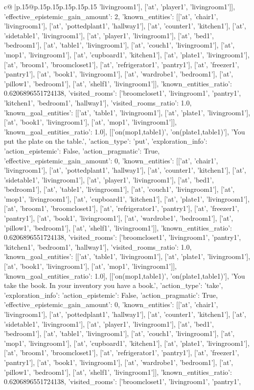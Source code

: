 \documentclass{article}
\begin{document}
{\begin{supertabular}{c@{$\;$}|p{.15\linewidth}@{}p{.15\linewidth}p{.15\linewidth}p{.15\linewidth}p{.15\linewidth}p{.15\linewidth}}
{{{'livingroom1'], ['at', 'player1', 'livingroom1']], 'effective_epistemic_gain_amount': 2, 'known_entities': [['at', 'chair1', 'livingroom1'], ['at', 'pottedplant1', 'hallway1'], ['at', 'counter1', 'kitchen1'], ['at', 'sidetable1', 'livingroom1'], ['at', 'player1', 'livingroom1'], ['at', 'bed1', 'bedroom1'], ['at', 'table1', 'livingroom1'], ['at', 'couch1', 'livingroom1'], ['at', 'mop1', 'livingroom1'], ['at', 'cupboard1', 'kitchen1'], ['at', 'plate1', 'livingroom1'], ['at', 'broom1', 'broomcloset1'], ['at', 'refrigerator1', 'pantry1'], ['at', 'freezer1', 'pantry1'], ['at', 'book1', 'livingroom1'], ['at', 'wardrobe1', 'bedroom1'], ['at', 'pillow1', 'bedroom1'], ['at', 'shelf1', 'livingroom1']], 'known_entities_ratio': 0.6206896551724138, 'visited_rooms': ['broomcloset1', 'livingroom1', 'pantry1', 'kitchen1', 'bedroom1', 'hallway1'], 'visited_rooms_ratio': 1.0, 'known_goal_entities': [['at', 'table1', 'livingroom1'], ['at', 'plate1', 'livingroom1'], ['at', 'book1', 'livingroom1'], ['at', 'mop1', 'livingroom1']], 'known_goal_entities_ratio': 1.0}}], [['on(mop1,table1)', 'on(plate1,table1)'], 'You put the plate on the table.', {'action_type': 'put', 'exploration_info': {'action_epistemic': False, 'action_pragmatic': True, 'effective_epistemic_gain_amount': 0, 'known_entities': [['at', 'chair1', 'livingroom1'], ['at', 'pottedplant1', 'hallway1'], ['at', 'counter1', 'kitchen1'], ['at', 'sidetable1', 'livingroom1'], ['at', 'player1', 'livingroom1'], ['at', 'bed1', 'bedroom1'], ['at', 'table1', 'livingroom1'], ['at', 'couch1', 'livingroom1'], ['at', 'mop1', 'livingroom1'], ['at', 'cupboard1', 'kitchen1'], ['at', 'plate1', 'livingroom1'], ['at', 'broom1', 'broomcloset1'], ['at', 'refrigerator1', 'pantry1'], ['at', 'freezer1', 'pantry1'], ['at', 'book1', 'livingroom1'], ['at', 'wardrobe1', 'bedroom1'], ['at', 'pillow1', 'bedroom1'], ['at', 'shelf1', 'livingroom1']], 'known_entities_ratio': 0.6206896551724138, 'visited_rooms': ['broomcloset1', 'livingroom1', 'pantry1', 'kitchen1', 'bedroom1', 'hallway1'], 'visited_rooms_ratio': 1.0, 'known_goal_entities': [['at', 'table1', 'livingroom1'], ['at', 'plate1', 'livingroom1'], ['at', 'book1', 'livingroom1'], ['at', 'mop1', 'livingroom1']], 'known_goal_entities_ratio': 1.0}}], [['on(mop1,table1)', 'on(plate1,table1)'], 'You take the book. In your inventory you have a book.', {'action_type': 'take', 'exploration_info': {'action_epistemic': False, 'action_pragmatic': True, 'effective_epistemic_gain_amount': 0, 'known_entities': [['at', 'chair1', 'livingroom1'], ['at', 'pottedplant1', 'hallway1'], ['at', 'counter1', 'kitchen1'], ['at', 'sidetable1', 'livingroom1'], ['at', 'player1', 'livingroom1'], ['at', 'bed1', 'bedroom1'], ['at', 'table1', 'livingroom1'], ['at', 'couch1', 'livingroom1'], ['at', 'mop1', 'livingroom1'], ['at', 'cupboard1', 'kitchen1'], ['at', 'plate1', 'livingroom1'], ['at', 'broom1', 'broomcloset1'], ['at', 'refrigerator1', 'pantry1'], ['at', 'freezer1', 'pantry1'], ['at', 'book1', 'livingroom1'], ['at', 'wardrobe1', 'bedroom1'], ['at', 'pillow1', 'bedroom1'], ['at', 'shelf1', 'livingroom1']], 'known_entities_ratio': 0.6206896551724138, 'visited_rooms': ['broomcloset1', 'livingroom1', 'pantry1', }}}
\end{supertabular}}
\end{document}

